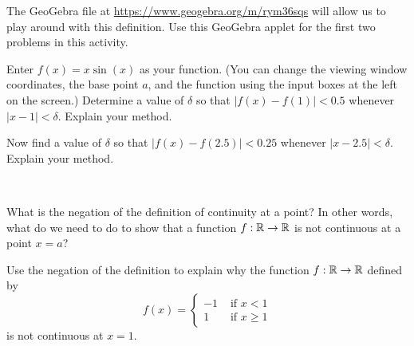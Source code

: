 \begin{pa} \label{pa:MS_continuity} The GeoGebra file at \url{https://www.geogebra.org/m/rym36sqs} will allow us to play around with this definition. Use this GeoGebra applet for the first two problems in this activity. 
\be
\item Enter $f(x)=x\sin(x)$ as your function. (You can change the viewing window coordinates, the base point $a$, and the function using the input boxes at the left on the screen.) Determine a value of $\delta$ so that $| f(x) - f(1) | < 0.5$ whenever $| x - 1 | < \delta$. Explain your method.

\item Now find a value of $\delta$ so that $| f(x) - f(2.5) | < 0.25$ whenever $| x - 2.5 | < \delta$. Explain your method.

\item ~
	\ba
	\item What is the negation of the definition of continuity at a point? In other words, what do we need to do to show that a function $f: \mathbb{R} \to \mathbb{R}$ is not continuous at a point $x=a$? 

	\item Use the negation of the definition to explain why the function $f : \mathbb{R} \to \mathbb{R}$ defined by 
	\[f(x) = \begin{cases} -1 &\text{ if } x < 1 \\ 1 &\text{ if } x \geq 1 \end{cases}\]
	is not continuous at $x=1$. 

	\ea
	
\ee


\end{pa}

